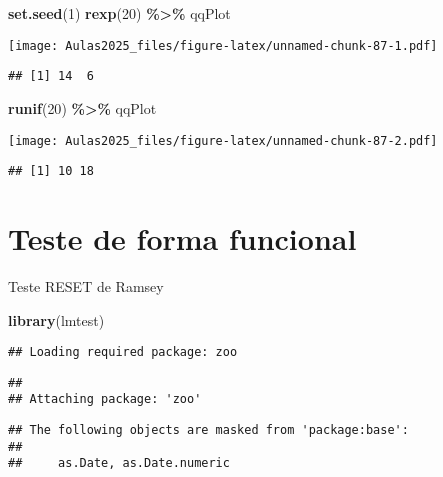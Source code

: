 \documentclass[
]{book}
\newenvironment{Shaded}{\begin{snugshade}}{\end{snugshade}}
\newcommand{\DecValTok}[1]{\textcolor[rgb]{0.00,0.00,0.81}{#1}}
\newcommand{\FunctionTok}[1]{\textcolor[rgb]{0.13,0.29,0.53}{\textbf{#1}}}
\newcommand{\NormalTok}[1]{#1}
\newcommand{\SpecialCharTok}[1]{\textcolor[rgb]{0.81,0.36,0.00}{\textbf{#1}}}
\begin{document}
\begin{Shaded}
\begin{Highlighting}[]
\FunctionTok{set.seed}\NormalTok{(}\DecValTok{1}\NormalTok{)}
\FunctionTok{rexp}\NormalTok{(}\DecValTok{20}\NormalTok{) }\SpecialCharTok{\%\textgreater{}\%}
\NormalTok{    qqPlot}
\end{Highlighting}
\end{Shaded}

\texttt{[image: Aulas2025\_files/figure-latex/unnamed-chunk-87-1.pdf]}

\begin{verbatim}
## [1] 14  6
\end{verbatim}

\begin{Shaded}
\begin{Highlighting}[]
\FunctionTok{runif}\NormalTok{(}\DecValTok{20}\NormalTok{) }\SpecialCharTok{\%\textgreater{}\%}
\NormalTok{    qqPlot}
\end{Highlighting}
\end{Shaded}

\texttt{[image: Aulas2025\_files/figure-latex/unnamed-chunk-87-2.pdf]}

\begin{verbatim}
## [1] 10 18
\end{verbatim}

\hypertarget{teste-de-forma-funcional}{%
\section{Teste de forma funcional}\label{teste-de-forma-funcional}}

Teste RESET de Ramsey

\begin{Shaded}
\begin{Highlighting}[]
\FunctionTok{library}\NormalTok{(lmtest)}
\end{Highlighting}
\end{Shaded}

\begin{verbatim}
## Loading required package: zoo
\end{verbatim}

\begin{verbatim}
## 
## Attaching package: 'zoo'
\end{verbatim}

\begin{verbatim}
## The following objects are masked from 'package:base':
## 
##     as.Date, as.Date.numeric
\end{verbatim}
\end{document}
